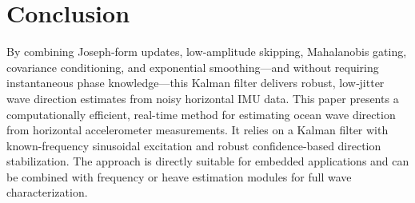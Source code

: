 \documentclass[12pt]{article}
\begin{document}
\section{Conclusion}
By combining Joseph‐form updates, low‐amplitude skipping, Mahalanobis gating, covariance conditioning, and exponential smoothing—and without requiring instantaneous phase knowledge—this Kalman filter delivers robust, low‐jitter wave direction estimates from noisy horizontal IMU data.
This paper presents a computationally efficient, real-time method for estimating ocean wave direction from horizontal accelerometer measurements. It relies on a Kalman filter with known-frequency sinusoidal excitation and robust confidence-based direction stabilization. The approach is directly suitable for embedded applications and can be combined with frequency or heave estimation modules for full wave characterization.
\end{document}
